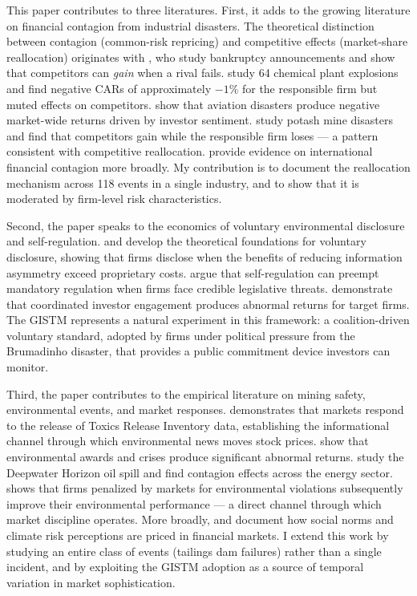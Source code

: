 \documentclass[12pt]{article}
\begin{document}
This paper contributes to three literatures. First, it adds to the growing literature on financial contagion from industrial disasters. The theoretical distinction between contagion (common-risk repricing) and competitive effects (market-share reallocation) originates with \citet{lang1992contagion}, who study bankruptcy announcements and show that competitors can \emph{gain} when a rival fails. \citet{capelle2010stock} study 64 chemical plant explosions and find negative CARs of approximately $-1\%$ for the responsible firm but muted effects on competitors. \citet{kaplanski2010sentiment} show that aviation disasters produce negative market-wide returns driven by investor sentiment. \citet{kowalewski2020stock} study potash mine disasters and find that competitors gain while the responsible firm loses --- a pattern consistent with competitive reallocation. \citet{bartram2009international} provide evidence on international financial contagion more broadly. My contribution is to document the reallocation mechanism across 118 events in a single industry, and to show that it is moderated by firm-level risk characteristics.

Second, the paper speaks to the economics of voluntary environmental disclosure and self-regulation. \citet{dye1985disclosure} and \citet{verrecchia1983discretionary} develop the theoretical foundations for voluntary disclosure, showing that firms disclose when the benefits of reducing information asymmetry exceed proprietary costs. \citet{maxwell2000self} argue that self-regulation can preempt mandatory regulation when firms face credible legislative threats. \citet{dimson2015active} demonstrate that coordinated investor engagement produces abnormal returns for target firms. The GISTM represents a natural experiment in this framework: a coalition-driven voluntary standard, adopted by firms under political pressure from the Brumadinho disaster, that provides a public commitment device investors can monitor.

Third, the paper contributes to the empirical literature on mining safety, environmental events, and market responses. \citet{hamilton1995pollution} demonstrates that markets respond to the release of Toxics Release Inventory data, establishing the informational channel through which environmental news moves stock prices. \citet{klassen1996impact} show that environmental awards and crises produce significant abnormal returns. \citet{humphrey2016does} study the Deepwater Horizon oil spill and find contagion effects across the energy sector. \citet{flammer2015does} shows that firms penalized by markets for environmental violations subsequently improve their environmental performance --- a direct channel through which market discipline operates. More broadly, \citet{hong2009price} and \citet{krueger2015climate} document how social norms and climate risk perceptions are priced in financial markets. I extend this work by studying an entire class of events (tailings dam failures) rather than a single incident, and by exploiting the GISTM adoption as a source of temporal variation in market sophistication.
\end{document}
